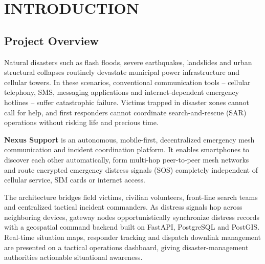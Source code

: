 \documentclass[12pt,a4paper]{report}
\begin{document}
\tableofcontents
\newpage
\listoffigures
\vspace{0.8cm}
\begingroup
\let\clearpage\relax
\let\cleardoublepage\relax
\listoftables
\endgroup
\newpage

\setcounter{page}{1}

\chapter{INTRODUCTION}

\section{Project Overview}
Natural disasters such as flash floods, severe earthquakes, landslides and urban structural collapses routinely devastate municipal power infrastructure and cellular towers. In these scenarios, conventional communication tools -- cellular telephony, SMS, messaging applications and internet-dependent emergency hotlines -- suffer catastrophic failure. Victims trapped in disaster zones cannot call for help, and first responders cannot coordinate search-and-rescue (SAR) operations without risking life and precious time.

\textbf{Nexus Support} is an autonomous, mobile-first, decentralized emergency mesh communication and incident coordination platform. It enables smartphones to discover each other automatically, form multi-hop peer-to-peer mesh networks and route encrypted emergency distress signals (SOS) completely independent of cellular service, SIM cards or internet access.

The architecture bridges field victims, civilian volunteers, front-line search teams and centralized tactical incident commanders. As distress signals hop across neighboring devices, gateway nodes opportunistically synchronize distress records with a geospatial command backend built on FastAPI, PostgreSQL and PostGIS. Real-time situation maps, responder tracking and dispatch downlink management are presented on a tactical operations dashboard, giving disaster-management authorities actionable situational awareness.
\end{document}
